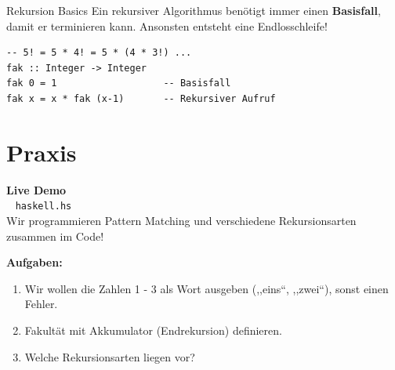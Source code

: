 \documentclass[aspectratio=169,11pt]{beamer}
\begin{document}
\begin{frame}[fragile]{Rekursion Basics}
    Ein rekursiver Algorithmus benötigt immer einen \textbf{Basisfall}, damit er terminieren kann. Ansonsten entsteht eine Endlosschleife!
    
    \begin{tcolorbox}[alertbox, title=Beispiel: Fakultät]
\begin{lstlisting}
-- 5! = 5 * 4! = 5 * (4 * 3!) ...
fak :: Integer -> Integer
fak 0 = 1                   -- Basisfall
fak x = x * fak (x-1)       -- Rekursiver Aufruf
\end{lstlisting}
    \end{tcolorbox}
\end{frame}

\section{Praxis}

\begin{frame}[plain]
    \begin{center}
        \Huge \textbf{Live Demo} \\
        \vspace{0.5cm}
        \large \faLaptopCode~ \texttt{haskell.hs} \\
        \vspace{0.3cm}
        \normalsize Wir programmieren Pattern Matching und verschiedene Rekursionsarten zusammen im Code!
    \end{center}
    
    \vspace{0.5cm}
    \textbf{Aufgaben:}
    \begin{enumerate}
        \item Wir wollen die Zahlen 1 - 3 als Wort ausgeben (,,eins``, ,,zwei``), sonst einen Fehler.
        \item Fakultät mit Akkumulator (Endrekursion) definieren.
        \item Welche Rekursionsarten liegen vor?
    \end{enumerate}
\end{frame}
\end{document}
